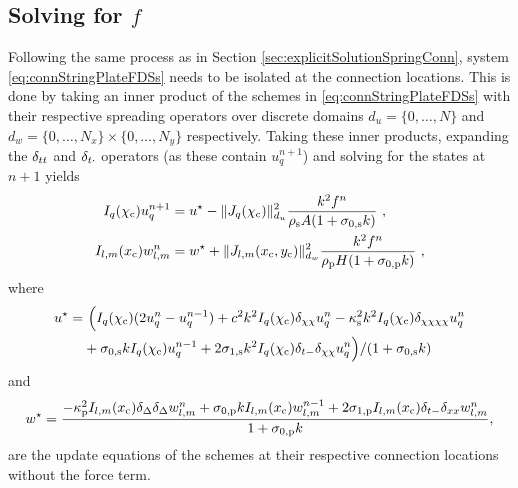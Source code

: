 \subsection{Solving for $f$}
Following the same process as in Section \ref{sec:explicitSolutionSpringConn}, system \eqref{eq:connStringPlateFDSs} needs to be isolated at the connection locations. This is done by taking an inner product of the schemes in \eqref{eq:connStringPlateFDSs} with their respective spreading operators over discrete domains $d_u = \{0, \hdots, N\}$ and $d_w = \{0, \hdots, N_x\}\times \{0, \hdots, N_y\}$ respectively. Taking these inner products, expanding the $\delta_{tt}$ and $\delta_{t\cdot}$ operators (as these contain $u_q^{n+1}$) and solving for the states at $n+1$ yields
\begin{subequations}\label{eq:connStringPlateFDSsAtConn}
    \begin{align}
        \Iq u_q^{n+1} &= u^\star- \lVert J_q(\chi_\ctxt)\rVert_{d_u}^2\frac{k^2f^n}{\rho_\stxt A(1+\szX[\stxt]k)}\ ,\\
        \Ilm w_{l,m}^n &= w^\star+ \lVert J_{l, m}(x_\ctxt, y_\ctxt)\rVert_{d_w}^2\frac{k^2f^n}{\rho_\ptxt H(1+\szX[\ptxt]k)}\ ,
    \end{align}
\end{subequations}
where
\begin{align*}
    u^{\star} =&\ \Big(\Iq (2\uqn - u_q^{n-1}) + c^2k^2 \Iq\dcc \uqn - \kappa_\stxt^2k^2 \Iq\dcccc \uqn\\
    &+ \szX[\stxt]k\Iq u_q^{n-1} + 2\soX[\stxt]k^2 \Iq\dtm\dcc \uqn\Big) / (1+\szX[\stxt]k)
\end{align*}
and
\begin{align*}
    w^\star =\frac{-\kappa_\ptxt^2\Ilm\dDelta\dDelta \wlmn + \szX[\ptxt]k\Ilm w_{l,m}^{n-1} + 2\soX[\ptxt] \Ilm\dtm\dxx \wlmn}{1+\szX[\ptxt]k},
\end{align*}
are the update equations of the schemes at their respective connection locations without the force term. 

